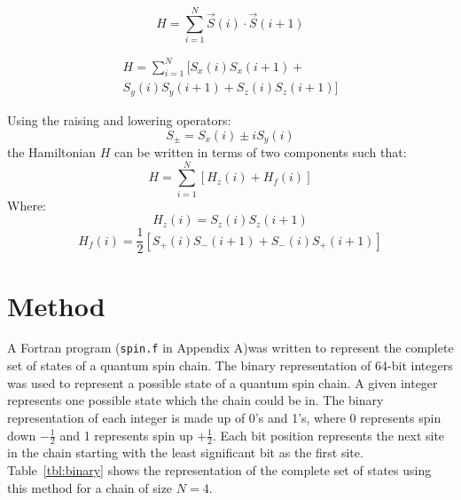 \documentclass[a4paper]{IEEEtran}
\begin{document}
    \begin{equation*} 
    H  =  \sum_{i = 1}^{N} \vec{S}(i) \cdot \vec{S}(i+1) 
    \end{equation*} 

    \begin{multline*} 
        H  =  \sum_{i = 1}^{N} [S_x(i)S_x(i+1) +  \\
                                S_y(i)S_y(i+1) +  
                                S_z(i)S_z(i+1) ]
    \end{multline*} 

    Using the raising and lowering operators:
        \[ S_{\pm} = S_x(i) \pm iS_y(i) \]
    the Hamiltonian $H$ can be written in terms of two components such that:
        \[ H = \sum_{i=1}^{N} \left[ H_z(i) + H_f(i) \right] \]
    Where:
    \[ H_z(i) = S_z(i)S_z(i+1) \]
    \[ H_f(i) = \frac{1}{2} \left[ S_{+}(i)S_{-}(i+1) + S_{-}(i)S_{+}(i+1) \right]  \]


\section{Method}

    A Fortran program (\texttt{spin.f} in Appendix A)was written to represent the 
    complete set of states of a 
    quantum spin chain. The binary representation of 64-bit integers was used 
    to represent a possible state of a quantum spin chain. A given integer
    represents one possible state which the chain could be in. The binary representation
    of each integer is made up of 0's and 1's, where 0 represents spin down $-\frac{1}{2}$
    and 1 represents spin up $+\frac{1}{2}$. Each bit position represents the next site
    in the chain starting with the least significant bit as the first site.
    Table~\ref{tbl:binary} shows the representation of the complete set of states using this method
    for a chain of size $N = 4$.
\end{document}
